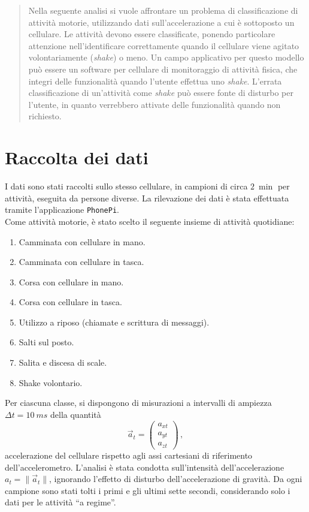 \documentclass[./main.tex]{subfiles}
\begin{document}
\begin{abstract}
\normalsize
Nella seguente analisi si vuole affrontare un problema di classificazione di attività motorie, utilizzando dati sull'accelerazione a cui è sottoposto un cellulare. Le attività devono essere classificate, ponendo particolare attenzione nell'identificare correttamente quando il cellulare viene agitato volontariamente ({\em shake}) o meno. Un campo applicativo per questo modello può essere un software per cellulare di monitoraggio di attività fisica, che integri delle funzionalità quando l'utente effettua uno {\em shake}. L'errata classificazione di un'attività come {\em shake} può essere fonte di disturbo per l'utente, in quanto verrebbero attivate delle funzionalità quando non richiesto.
\end{abstract}
\section{Raccolta dei dati}
I dati sono stati raccolti sullo stesso cellulare, in campioni di circa $\SI{2}{\min}$ per attività, eseguita da persone diverse. La rilevazione dei dati è stata effettuata tramite l'applicazione \texttt{PhonePi}\cite{kumarPhonePiSampleServer2019}.\\
Come attività motorie, è stato scelto il seguente insieme di attività quotidiane:
\begin{enumerate}
	\item Camminata con cellulare in mano.
	\item Camminata con cellulare in tasca.
	\item Corsa con cellulare in mano.
	\item Corsa con cellulare in tasca.
	\item Utilizzo a riposo (chiamate e scrittura di messaggi).
	\item Salti sul posto.
	\item Salita e discesa di scale.
	\item Shake volontario.
\end{enumerate}
Per ciascuna classe, si dispongono di misurazioni a intervalli di ampiezza $\Delta t = \SI{10}{ms}$ della quantità
$$
\vec{a}_t = \begin{pmatrix}
a_{xt}\\
a_{yt}\\
a_{zt}
\end{pmatrix}\,,
$$
accelerazione del cellulare rispetto agli assi cartesiani di riferimento dell'accelerometro. L'analisi è stata condotta sull'intensità dell'accelerazione $a_t = \|\vec{a}_t\|$, ignorando l'effetto di disturbo dell'accelerazione di gravità. Da ogni campione sono stati tolti i primi e gli ultimi sette secondi, considerando solo i dati per le attività ``a regime''.
\end{document}
